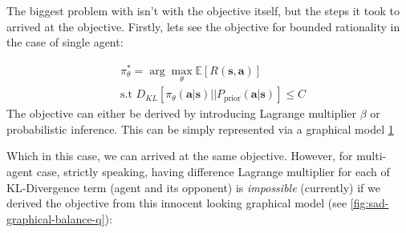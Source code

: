 The biggest problem with \cite{grau2018balancing} isn't with the objective itself, but the steps it took to arrived at the objective. Firstly, lets see the objective for bounded rationality in the case of single agent:

\begin{equation}
    \begin{aligned}
        &\pi_{\theta}^* = \arg\max_{\theta} \mathbb{E}\left[ R(\boldsymbol{s}, \boldsymbol{a}) \right] \\
        &\text{s.t } D_{KL}\left[ \pi_{\theta}(\boldsymbol{a} | \boldsymbol{s}) \Big|\Big| P_{\text{prior}}(\boldsymbol{a} | \boldsymbol{s}) \right] \le C
    \end{aligned}
\end{equation}
The objective can either be derived by introducing Lagrange multiplier $\beta$ or probabilistic inference. This can be simply represented via a graphical model \ref{fig:one-step-single agent}
\begin{figure}[t]
    \begin{minipage}[t]{0.5\linewidth}
    \centering
    \end{minipage}%
    \begin{minipage}[t]{0.5\linewidth}
    \label{fig:one-step-single agent}
    \end{minipage}
\end{figure}
Which in this case, we can arrived at the same objective. However, for multi-agent case, strictly speaking, having difference Lagrange multiplier for each of KL-Divergence term (agent and its opponent) is \emph{impossible} (currently) if we derived the objective from this innocent looking graphical model (see \ref{fig:sad-graphical-balance-q}): 

